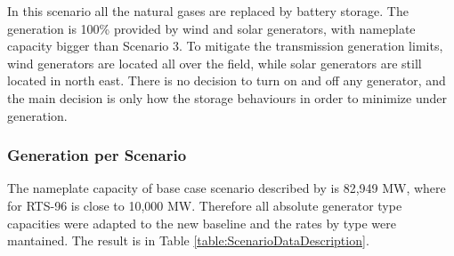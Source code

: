 \documentclass[12pt,LUDisStyle,twosided]{book}
\begin{document}
In this scenario all the natural gases are replaced by battery storage. The generation is 100\% provided by wind and solar generators, with nameplate capacity bigger than Scenario 3. To mitigate the transmission generation limits, wind generators are located all over the field, while solar generators are still located in north east. There is no decision to turn on and off any generator, and the main decision is only how the storage behaviours in order to minimize under generation.

\subsubsection{Generation per Scenario}

The nameplate capacity of base case scenario described by \citeauthor{shavel} \cite{shavel} is 82,949 MW, where for RTS-96 is close to 10,000 MW. Therefore all absolute generator type capacities were adapted to the new baseline and the rates by type were mantained. The result is in Table \ref{table:ScenarioDataDescription}.
\end{document}
